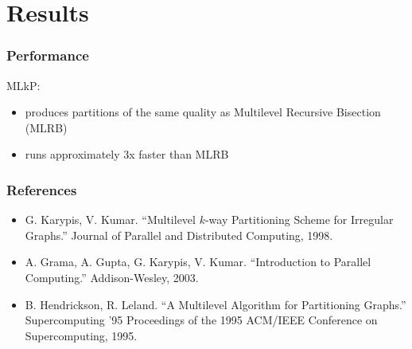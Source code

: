 \documentclass{beamer}
\begin{document}
\section{Results}

\begin{frame}
  \frametitle{Performance}

  MLkP:
  \begin{itemize}
    \item produces partitions of the same quality as Multilevel Recursive Bisection (MLRB)
    \item runs approximately 3x faster than MLRB
  \end{itemize}

\end{frame}

\begin{frame}
  \frametitle{References}

  \begin{itemize}
    \item G. Karypis, V. Kumar. ``Multilevel $k$-way Partitioning Scheme for Irregular Graphs.'' Journal of Parallel and Distributed Computing, 1998.

    \item A. Grama, A. Gupta, G. Karypis, V. Kumar. ``Introduction to Parallel Computing.'' Addison-Wesley, 2003.

    \item B. Hendrickson, R. Leland. ``A Multilevel Algorithm for Partitioning Graphs.'' Supercomputing '95 Proceedings of the 1995 ACM/IEEE
      Conference on Supercomputing, 1995.
  \end{itemize}
\end{frame}
\end{document}
